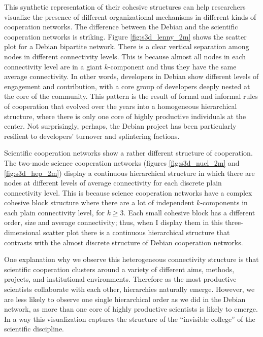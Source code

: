 This synthetic representation of their cohesive structures can help researchers visualize the presence of different organizational mechanisms in different kinds of cooperation networks. The difference between the Debian and the scientific cooperation networks is striking. Figure \ref{fig:s3d_lenny_2m} shows the scatter plot for a Debian bipartite network. There is a clear vertical separation among nodes in different connectivity levels. This is because almost all nodes in each connectivity level are in a giant $k$-component and thus they have the same average connectivity. In other words, developers in Debian show different levels of engagement and contribution, with a core group of developers deeply nested at the core of the community.  This pattern is the result of formal and informal rules of cooperation that evolved over the years \citep{ferraro:2007} into a homogeneous hierarchical structure, where there is only one core of highly productive individuals at the center. Not surprisingly, perhaps, the Debian project has been particularly resilient to developers' turnover and splintering factions.

Scientific cooperation networks show a rather different structure of cooperation. The two-mode science cooperation networks (figures \ref{fig:s3d_nucl_2m} and \ref{fig:s3d_hep_2m}) display a continuous hierarchical structure in which there are nodes at different levels of average connectivity for each discrete plain connectivity level. This is because science cooperation networks have a complex cohesive block structure where there are a lot of independent $k$-components in each plain connectivity level, for $k \ge 3$. Each small cohesive block has a different order, size and average connectivity; thus, when I display them in this three-dimensional scatter plot there is a continuous hierarchical structure that contrasts with the almost discrete structure of Debian cooperation networks.

One explanation why we observe this heterogeneous connectivity structure is that scientific cooperation clusters around a variety of different aims, methods, projects, and institutional environments. Therefore as the most productive scientists collaborate with each other, hierarchies naturally emerge. However, we are less likely to observe one single hierarchical order as we did in the Debian network, as more than one core of highly productive scientists is likely to emerge. In a way this visualization captures the structure of the ``invisible college'' of the scientific discipline.

